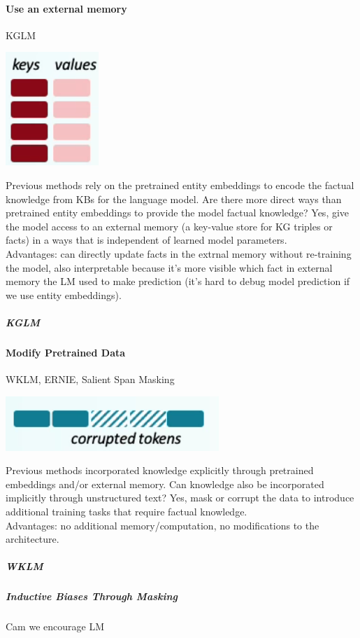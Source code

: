\documentclass[10pt]{report}
\begin{document}
\paragraph{Use an external memory} KGLM
\begin{center}
	\includegraphics[scale=0.5]{107.png}
\end{center}
Previous methods rely on the pretrained entity embeddings to encode the factual knowledge from KBs for the language model. Are there more direct ways than pretrained entity embeddings to provide the model factual knowledge? Yes, give the model access to an external memory (a key-value store for KG triples or facts) in a ways that is independent of learned model parameters.\\
Advantages: can directly update facts in the extrnal memory without re-training the model, also interpretable because it's more visible which fact in external memory the LM used to make prediction (it's hard to debug model prediction if we use entity embeddings).
\subparagraph{KGLM} %
\paragraph{Modify Pretrained Data} WKLM, ERNIE, Salient Span Masking
\begin{center}
	\includegraphics[scale=0.5]{108.png}
\end{center}
Previous methods incorporated knowledge explicitly through pretrained embeddings and/or external memory. Can knowledge also be incorporated implicitly through unstructured text? Yes, mask or corrupt the data to introduce additional training tasks that require factual knowledge.\\
Advantages: no additional memory/computation, no modifications to the architecture.
\subparagraph{WKLM} %
\subparagraph{Inductive Biases Through Masking} Cam we encourage LM %
\end{document}
